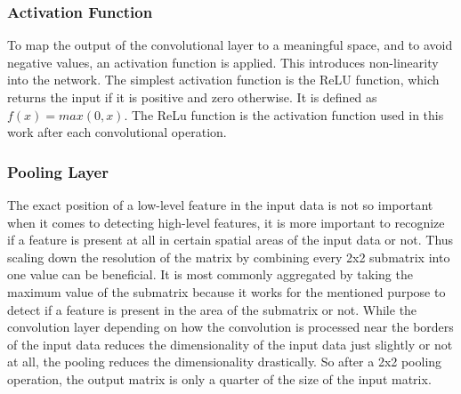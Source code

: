 \subsubsection*{Activation Function}

To map the output of the convolutional layer to a meaningful space, and to avoid negative values, an activation function is applied. This introduces non-linearity into the network. The simplest activation function is the ReLU function, which returns the input if it is positive and zero otherwise. It is defined as $f(x) = max(0, x)$. The ReLu function is the activation function used in this work after each convolutional operation.

\subsubsection*{Pooling Layer}

The exact position of a low-level feature in the input data is not so important when it comes to detecting high-level features,
it is more important to recognize if a feature is present at all in certain spatial areas of the input data or not.
Thus scaling down the resolution of the matrix by combining every 2x2 submatrix into one value can be beneficial.
It is most commonly aggregated by taking the maximum value of the submatrix because it works for the mentioned purpose to detect if a feature is present in the area of the submatrix or not. While the convolution layer depending on how the convolution is processed near the borders of the input data reduces the dimensionality of the input data just slightly or not at all, the pooling reduces the dimensionality drastically. So after a 2x2 pooling operation, the output matrix is only a quarter of the size of the input matrix.

